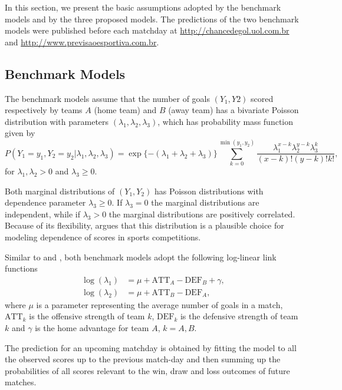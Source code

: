 \documentclass[journal,article,accept,moreauthors,pdftex,12pt,a4paper]{mdpi}
\begin{document}
    In this section, we present the basic assumptions adopted by the benchmark models and
    by the three proposed models. The predictions of the
    two benchmark models were published before each matchday at
    \url{http://chancedegol.uol.com.br} and
    \url{http://www.previsaoesportiva.com.br}.

    {\color{red} \subsection{Benchmark Models}
    \label{sec::Benchmark}

    The benchmark models assume that the number of goals $(Y_1, Y2)$ scored respectively by teams $A$ (home team) and $B$ (away
    team) has a bivariate Poisson distribution \citep{Holgate64} with parameters $(\lambda_1, \lambda_2, \lambda_3)$,
    which has probability mass function given by
\begin{equation*}
P(Y_1 = y_1, Y_2 = y_2 | \lambda_1, \lambda_2, \lambda_3) =
\exp\{-(\lambda_1 + \lambda_2 + \lambda_3)\}
 \sum_{k = 0}^{\min(y_1, y_2)} \dfrac{\lambda_1^{x - k} \lambda_2^{y - k} \lambda_3^k}{(x-k)!(y -
 k)!k!}, \label{eq::pois.biv}
\end{equation*}
for $\lambda_1, \lambda_2 > 0$ and $\lambda_3 \geq 0$.

Both marginal distributions of $(Y_1, Y_2)$ has Poisson
distributions with dependence parameter $\lambda_3 \geq 0$. If
$\lambda_3 = 0$ the marginal distributions are independent, while if
$\lambda_3 > 0$ the marginal distributions are positively
correlated. Because of its flexibility, \cite{Karlis2003} argues
that this distribution is a plausible choice for modeling dependence
of scores in sports competitions.


Similar to \cite{Lee97} and \cite{Karlis2003}, both benchmark models
adopt the following log-linear link functions
\begin{align*}
\log(\lambda_1) &= \mu + \text{ATT}_A - \text{DEF}_B + \gamma, \\
\log(\lambda_2) &= \mu + \text{ATT}_B - \text{DEF}_A,
\end{align*}
where $\mu$ is a parameter representing the average number of goals
in a match, $\text{ATT}_k$ is the offensive strength of team $k$,
$\text{DEF}_k$ is the defensive strength of team $k$ and $\gamma$ is
the home advantage for team $A$, $k = A, B$.

The prediction for an upcoming matchday is obtained by fitting the
model to all the observed scores up to the previous match-day and
then summing up the probabilities of all scores relevant to the win,
draw and loss outcomes of future matches.}
\end{document}
